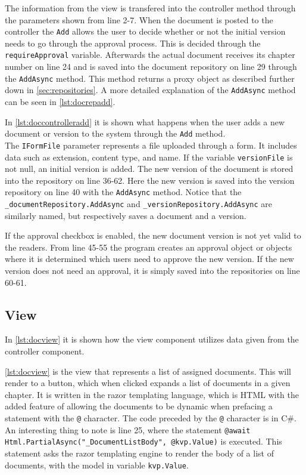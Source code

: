 The information from the view is transfered into the controller method through the parameters shown from line 2-7.
When the document is posted to the controller the \texttt{Add} allows the user to decide whether or not the initial version needs to go through the approval process. This is decided through the \texttt{requireApproval} variable.
Afterwards the actual document receives its chapter number on line 24 and is saved into the document repository on line 29 through the \texttt{AddAsync} method.
This method returns a proxy object as described further down in \cref{sec:repositories}.
A more detailed explanation of the \texttt{AddAsync} method can be seen in \cref{lst:docrepadd}.

In \cref{lst:doccontrolleradd} it is shown what happens when the user adds a new document or version to the system through the \texttt{Add} method.
\\



The \texttt{IFormFile} parameter represents a file uploaded through a form. It includes data such as extension, content type, and name.
If the variable \texttt{versionFile} is not null, an initial version is added.
The new version of the document is stored into the repository on line 36-62.
Here the new version is saved into the version repository on line 40 with the \texttt{AddAsync} method.
Notice that the \texttt{_documentRepository.AddAsync} and \texttt{_versionRepository.AddAsync} are similarly named, but respectively saves a document and a version.

If the approval checkbox is enabled, the new document version is not yet valid to the readers.
From line 45-55 the program creates an approval object or objects where it is determined which users need to approve the new version.
If the new version does not need an approval, it is simply saved into the repositories on line 60-61.

\subsection{View}

In \cref{lst:docview} it is shown how the view component utilizes data given from the controller component.

\cref{lst:docview} is the view that represents a list of assigned documents.
This will render to a button, which when clicked expands a list of documents in a given chapter.
It is written in the razor templating language, which is HTML with the added feature of allowing the documents to be dynamic when prefacing a statement with the \texttt{@} character.
The code preceded by the \texttt{@} character is in C\#.
An interesting thing to note is line 25, where the statement \texttt{@await Html.PartialAsync("_DocumentListBody", @kvp.Value)} is executed.
This statement asks the razor templating engine to render the body of a list of documents, with the model in variable \texttt{kvp.Value}.

